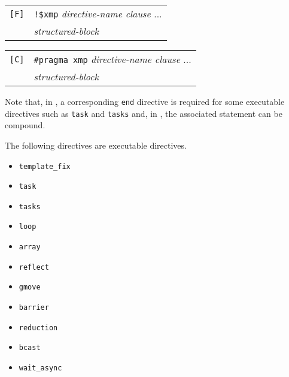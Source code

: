 \vspace{0.5cm}

\begin{tabular}{ll}
\verb![F]! & \verb|!$xmp| {\it directive-name clause} ...\\
 & \hspace{0.5cm} {\it structured-block} \\
\end{tabular}

\vspace{0.3cm}

\begin{tabular}{ll}
\verb![C]! & \verb|#pragma xmp| {\it directive-name clause} ...\\
 & \hspace{0.5cm} {\it structured-block} \\
\end{tabular}

\vspace{0.5cm}

Note that, in {\XMPF}, a corresponding {\tt end} directive is required
for some executable directives such as {\tt task} and {\tt tasks} and,
in {\XMPC}, the associated statement can be compound.

%

The following directives are executable directives.

\begin{itemize}
 \item {\tt template\_fix}
 \item {\tt task}
 \item {\tt tasks}
 \item {\tt loop}
 \item {\tt array}
 \item {\tt reflect}
 \item {\tt gmove}
 \item {\tt barrier}
 \item {\tt reduction}
 \item {\tt bcast}
 \item {\tt wait\_async}
\end{itemize}


